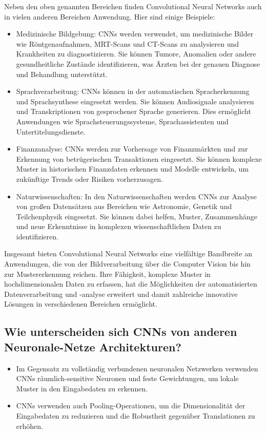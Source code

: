     Neben den oben genannten Bereichen finden Convolutional Neural Networks auch in vielen anderen Bereichen Anwendung. Hier sind einige Beispiele:
    \begin{itemize}
    \item Medizinische Bildgebung: CNNs werden verwendet, um medizinische Bilder wie Röntgenaufnahmen, MRT-Scans und CT-Scans zu analysieren und Krankheiten zu diagnostizieren. Sie können Tumore, Anomalien oder andere gesundheitliche Zustände identifizieren, was Ärzten bei der genauen Diagnose und Behandlung unterstützt.

    \item Sprachverarbeitung: CNNs können in der automatischen Spracherkennung und Sprachsynthese eingesetzt werden. Sie können Audiosignale analysieren und Transkriptionen von gesprochener Sprache generieren. Dies ermöglicht Anwendungen wie Sprachsteuerungssysteme, Sprachassistenten und Untertitelungsdienste.

    \item Finanzanalyse: CNNs werden zur Vorhersage von Finanzmärkten und zur Erkennung von betrügerischen Transaktionen eingesetzt. Sie können komplexe Muster in historischen Finanzdaten erkennen und Modelle entwickeln, um zukünftige Trends oder Risiken vorherzusagen.

    \item Naturwissenschaften: In den Naturwissenschaften werden CNNs zur Analyse von großen Datensätzen aus Bereichen wie Astronomie, Genetik und Teilchenphysik eingesetzt. Sie können dabei helfen, Muster, Zusammenhänge und neue Erkenntnisse in komplexen wissenschaftlichen Daten zu identifizieren.

    \end{itemize}
    
Insgesamt bieten Convolutional Neural Networks eine vielfältige Bandbreite an Anwendungen, die von der Bildverarbeitung über die Computer Vision bis hin zur Mustererkennung reichen. Ihre Fähigkeit, komplexe Muster in hochdimensionalen Daten zu erfassen, hat die Möglichkeiten der automatisierten Datenverarbeitung und -analyse erweitert und damit zahlreiche innovative Lösungen in verschiedenen Bereichen ermöglicht.

\subsection{Wie unterscheiden sich CNNs von anderen Neuronale-Netze Architekturen?}
\begin{itemize}
  \item Im Gegensatz zu vollständig verbundenen neuronalen Netzwerken verwenden CNNs räumlich-sensitive Neuronen und feste Gewichtungen, um lokale Muster in den Eingabedaten zu erkennen.
  \item CNNs verwenden auch Pooling-Operationen, um die Dimensionalität der Eingabedaten zu reduzieren und die Robustheit gegenüber Translationen zu erhöhen.
\end{itemize}

